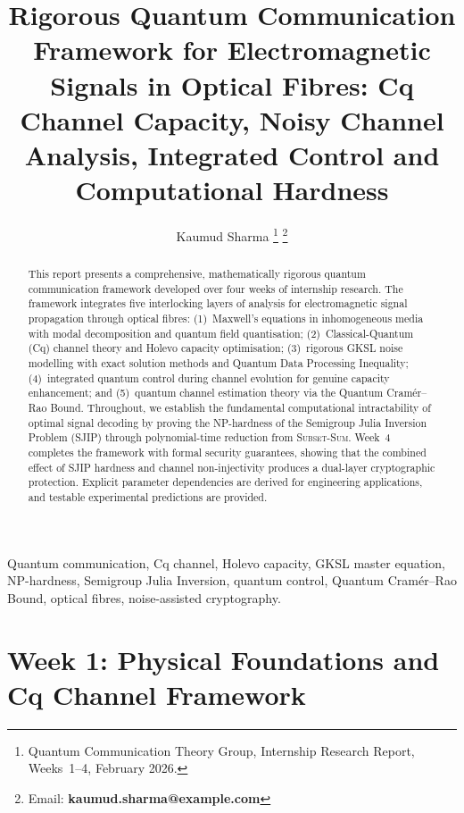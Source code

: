 \documentclass[journal,twocolumn]{IEEEtran}
\theoremstyle{definition}
\theoremstyle{plain}
\begin{document}
\title{Rigorous Quantum Communication Framework for Electromagnetic
Signals in Optical Fibres: Cq Channel Capacity, Noisy Channel Analysis,
Integrated Control and Computational Hardness}

\author{Kaumud Sharma%
  \thanks{Quantum Communication Theory Group, Internship Research Report, Weeks~1--4, February 2026.}%
  \thanks{Email: \textbf{kaumud.sharma@example.com}}%
}

\maketitle

\begin{abstract}
This report presents a comprehensive, mathematically rigorous quantum
communication framework developed over four weeks of internship research.
The framework integrates five interlocking layers of analysis for
electromagnetic signal propagation through optical fibres:
(1)~Maxwell's equations in inhomogeneous media with modal decomposition
and quantum field quantisation; (2)~Classical-Quantum (Cq) channel
theory and Holevo capacity optimisation; (3)~rigorous GKSL noise
modelling with exact solution methods and Quantum Data Processing
Inequality; (4)~integrated quantum control during channel evolution for
genuine capacity enhancement; and (5)~quantum channel estimation theory
via the Quantum Cram\'{e}r--Rao Bound. Throughout, we establish the
fundamental computational intractability of optimal signal decoding by
proving the NP-hardness of the Semigroup Julia Inversion Problem (SJIP)
through polynomial-time reduction from \textsc{Subset-Sum}. Week~4
completes the framework with formal security guarantees, showing that
the combined effect of SJIP hardness and channel non-injectivity
produces a dual-layer cryptographic protection. Explicit parameter
dependencies are derived for engineering applications, and testable
experimental predictions are provided.
\end{abstract}

\begin{IEEEkeywords}
Quantum communication, Cq channel, Holevo capacity, GKSL master equation,
NP-hardness, Semigroup Julia Inversion, quantum control, Quantum
Cram\'{e}r--Rao Bound, optical fibres, noise-assisted cryptography.
\end{IEEEkeywords}

\section{Week 1: Physical Foundations and Cq Channel Framework}
\end{document}
